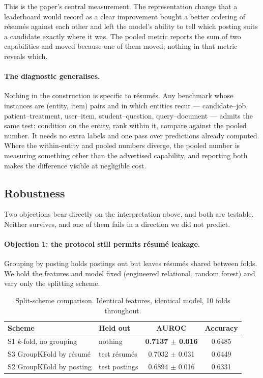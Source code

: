\documentclass[11pt]{article}                      %
\newcommand{\tabfont}{\footnotesize}
\begin{document}
This is the paper's central measurement. The representation change that a
leaderboard would record as a clear improvement bought a better ordering of
résumés against each other and left the model's ability to tell which posting
suits a candidate exactly where it was. The pooled metric reports the sum of two
capabilities and moved because one of them moved; nothing in that metric reveals
which.

\paragraph{The diagnostic generalises.}
Nothing in the construction is specific to résumés. Any benchmark whose instances
are (entity, item) pairs and in which entities recur --- candidate--job,
patient--treatment, user--item, student--question, query--document --- admits the
same test: condition on the entity, rank within it, compare against the pooled
number. It needs no extra labels and one pass over predictions already computed.
Where the within-entity and pooled numbers diverge, the pooled number is
measuring something other than the advertised capability, and reporting both
makes the difference visible at negligible cost.

\subsection{Robustness}
\label{sec:robust}

Two objections bear directly on the interpretation above, and both are testable.
Neither survives, and one of them fails in a direction we did not predict.

\paragraph{Objection 1: the protocol still permits résumé leakage.}
Grouping by posting holds postings out but leaves résumés shared between folds.
We hold the features and model fixed (engineered relational, random forest) and
vary only the splitting scheme.

\begin{table}[h]
\centering\tabfont
\caption{Split-scheme comparison. Identical features, identical model, 10 folds
throughout.}
\label{tab:splits}
\begin{tabular}{llcc}
\toprule
Scheme & Held out & AUROC & Accuracy \\
\midrule
S1 $k$-fold, no grouping & nothing & \textbf{0.7137 $\pm$ 0.016} & 0.6485 \\
S3 GroupKFold by résumé  & test résumés & 0.7032 $\pm$ 0.031 & 0.6449 \\
S2 GroupKFold by posting & test postings & 0.6894 $\pm$ 0.016 & 0.6331 \\
\bottomrule
\end{tabular}
\end{table}
\end{document}
